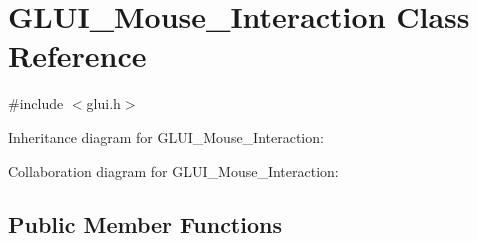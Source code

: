\hypertarget{class_g_l_u_i___mouse___interaction}{\section{G\+L\+U\+I\+\_\+\+Mouse\+\_\+\+Interaction Class Reference}
\label{class_g_l_u_i___mouse___interaction}
}


{\ttfamily \#include $<$glui.\+h$>$}



Inheritance diagram for G\+L\+U\+I\+\_\+\+Mouse\+\_\+\+Interaction\+:


Collaboration diagram for G\+L\+U\+I\+\_\+\+Mouse\+\_\+\+Interaction\+:
\subsection*{Public Member Functions}
